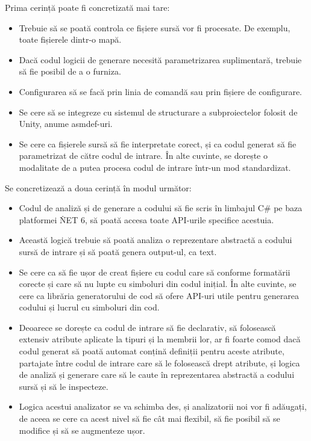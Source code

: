 \documentclass[a4paper,12pt]{report}
\begin{document}
Prima cerință poate fi concretizată mai tare:

\begin{itemize}
  \item Trebuie să se poată controla ce fișiere sursă vor fi procesate. De exemplu, toate fișierele dintr-o mapă.
  \item Dacă codul logicii de generare necesită parametrizarea suplimentară, trebuie să fie posibil de a o furniza.
  \item Configurarea să se facă prin linia de comandă sau prin fișiere de configurare.
  \item Se cere să se integreze cu sistemul de structurare a subproiectelor folosit de Unity, anume asmdef-uri.
  \item Se cere ca fișierele sursă să fie interpretate corect, și ca codul generat să fie parametrizat de către codul de intrare. În alte cuvinte, se dorește o modalitate de a putea procesa codul de intrare într-un mod standardizat.
\end{itemize}


Se concretizează a doua cerință în modul următor:

\begin{itemize}
  \item Codul de analiză și de generare a codului să fie scris în limbajul C\# pe baza platformei \. NET 6, să poată accesa toate API-urile specifice acestuia.
  \item Această logică trebuie să poată analiza o reprezentare abstractă a codului sursă de intrare și să poată genera output-ul, ca text.
  \item Se cere ca să fie ușor de creat fișiere cu codul care să conforme formatării corecte și care să nu lupte cu simboluri din codul inițial.
  În alte cuvinte, se cere ca librăria generatorului de cod să ofere API-uri utile pentru generarea codului și lucrul cu simboluri din cod.
  \item Deoarece se dorește ca codul de intrare să fie declarativ, să folosească extensiv atribute aplicate la tipuri și la membrii lor, ar fi foarte
  comod dacă codul generat să poată automat conțină definiții pentru aceste atribute, partajate între codul de intrare care să le folosească drept atribute,
  și logica de analiză și generare care să le caute în reprezentarea abstractă a codului sursă și să le inspecteze.
  \item Logica acestui analizator se va schimba des, și analizatorii noi vor fi adăugați, de aceea se cere ca acest nivel să fie cât mai flexibil, să fie posibil să se modifice și să se augmenteze ușor.
\end{itemize}
\end{document}
